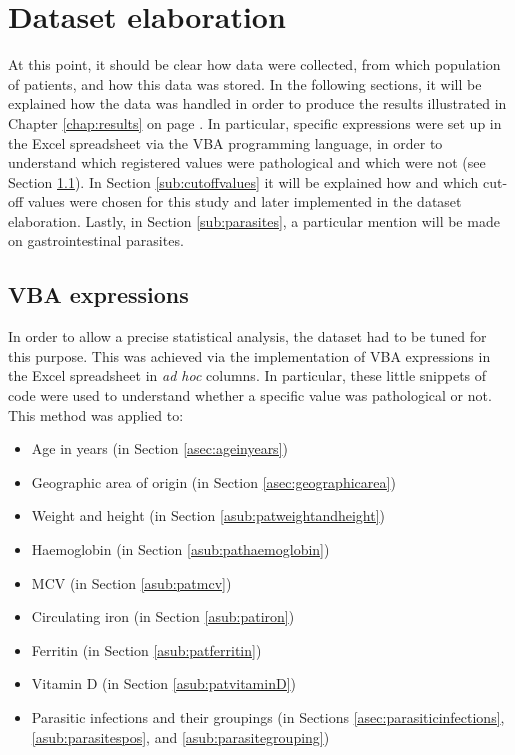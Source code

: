 \section{Dataset elaboration}\label{sec:datasetelaboration}
At this point, it should be clear how data were collected, from which population of patients, and how this data was stored. In the following sections, it will be explained how the data was handled in order to produce the results illustrated in Chapter \ref{chap:results} on page \pageref{chap:results}. In particular, specific expressions were set up in the Excel spreadsheet via the VBA programming language, in order to understand which registered values were pathological and which were not (see Section \ref{sub:vbaexpressions}). In Section \ref{sub:cutoffvalues} it will be explained how and which cut-off values were chosen for this study and later implemented in the dataset elaboration. Lastly, in Section \ref{sub:parasites}, a particular mention will be made on gastrointestinal parasites.

\subsection{VBA expressions}\label{sub:vbaexpressions}
In order to allow a precise statistical analysis, the dataset had to be tuned for this purpose. This was achieved via the implementation of VBA expressions in the Excel spreadsheet in \textit{ad hoc} columns. In particular, these little snippets of code were used to understand whether a specific value was pathological or not. This method was applied to:

\begin{itemize}
	\item Age in years (in Section \ref{asec:ageinyears})
	\item Geographic area of origin (in Section \ref{asec:geographicarea})
	\item Weight and height (in Section \ref{asub:patweightandheight})
	\item Haemoglobin (in Section \ref{asub:pathaemoglobin})
	\item MCV (in Section \ref{asub:patmcv})
	\item Circulating iron (in Section \ref{asub:patiron})
	\item Ferritin (in Section \ref{asub:patferritin})
	\item Vitamin D (in Section \ref{asub:patvitaminD})
	\item Parasitic infections and their groupings (in Sections \ref{asec:parasiticinfections}, \ref{asub:parasitespos}, and \ref{asub:parasitegrouping})
\end{itemize}

